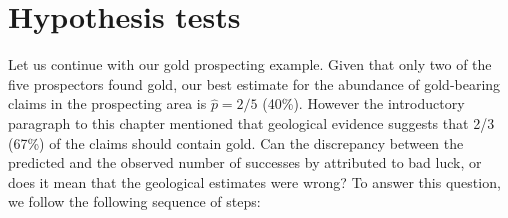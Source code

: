 \section{Hypothesis tests}
\label{sec:binomH}

Let us continue with our gold prospecting example. Given that only two
of the five prospectors found gold, our best estimate for the
abundance of gold-bearing claims in the prospecting area is $\hat{p} =
2/5$ (40\%). However the introductory paragraph to this chapter
mentioned that geological evidence suggests that 2/3 (67\%) of the
claims should contain gold. Can the discrepancy between the predicted
and the observed number of successes by attributed to bad luck, or
does it mean that the geological estimates were wrong? To answer this
question, we follow the following sequence of steps:

